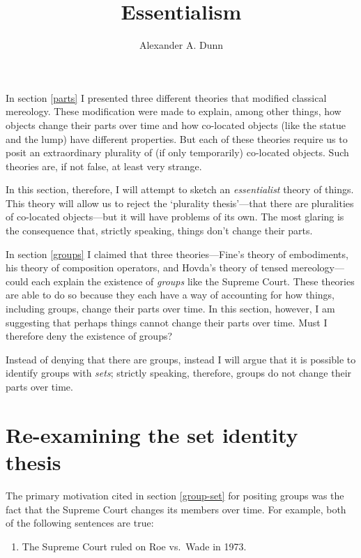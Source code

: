 \documentclass[11pt]{article}
\title{Essentialism}
\author{Alexander A. Dunn}
\begin{document}
\ifstandalone
\maketitle
\begin{spacing}{1.5}
\fi

\label{essential}

In section \ref{parts} I presented three different theories that
modified classical mereology.  These modification were made to
explain, among other things, how objects change their parts over time
and how co-located objects (like the statue and the lump) have
different properties.  But each of these theories require us to posit
an extraordinary plurality of (if only temporarily) co-located
objects.  Such theories are, if not false, at least very strange.

In this section, therefore, I will attempt to sketch an {\em
  essentialist} theory of things.  This theory will allow us to reject
the `plurality thesis'---that there are pluralities of co-located
objects---but it will have problems of its own.  The most glaring is
the consequence that, strictly speaking, things don't change their
parts.

In section \ref{groups} I claimed that three theories---Fine's theory
of embodiments, his theory of composition operators, and Hovda's
theory of tensed mereology---could each explain the existence of {\em
  groups} like the Supreme Court.  These theories are able to do so
because they each have a way of accounting for how things, including
groups, change their parts over time.  In this section, however, I am
suggesting that perhaps things cannot change their parts over time.
Must I therefore deny the existence of groups?

Instead of denying that there are groups, instead I will argue that it
is possible to identify groups with {\em sets}; strictly speaking,
therefore, groups do not change their parts over time.

\section{Re-examining the set identity thesis}
\label{set-id}
The primary motivation cited in section \ref{group-set} for positing
groups was the fact that the Supreme Court changes its members over
time.  For example, both of the following sentences are true:

\begin{enumerate}[ref=(\arabic*)]
  \item The Supreme Court ruled on Roe vs.\ Wade in 1973. \label{roe1}


\end{enumerate}
\end{spacing}
\end{document}
